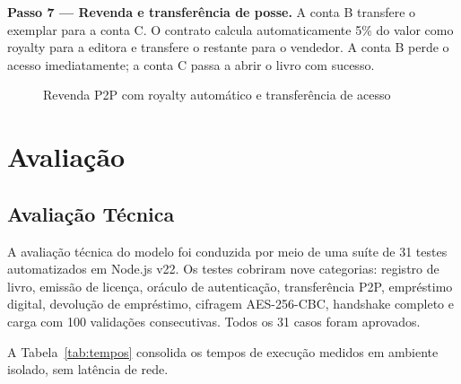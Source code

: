 \documentclass[12pt]{article}
\begin{document}
\textbf{Passo 7 — Revenda e transferência de posse.} A conta B transfere o exemplar para a conta C. O contrato calcula automaticamente 5\% do valor como royalty para a editora e transfere o restante para o vendedor. A conta B perde o acesso imediatamente; a conta C passa a abrir o livro com sucesso.

\begin{figure}[H]
\centering
\caption{Revenda P2P com royalty automático e transferência de acesso}
\label{fig:revenda}
\end{figure}

\section{Avaliação}

\subsection{Avaliação Técnica}

A avaliação técnica do modelo foi conduzida por meio de uma suíte de 31 testes automatizados em Node.js v22. Os testes cobriram nove categorias: registro de livro, emissão de licença, oráculo de autenticação, transferência P2P, empréstimo digital, devolução de empréstimo, cifragem AES-256-CBC, handshake completo e carga com 100 validações consecutivas. Todos os 31 casos foram aprovados.

A Tabela~\ref{tab:tempos} consolida os tempos de execução medidos em ambiente isolado, sem latência de rede.
\end{document}
